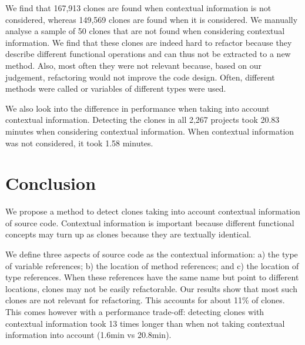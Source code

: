 \documentclass[conference]{IEEEtran}
\begin{document}
We find that 167,913 clones are found when contextual information is not considered, whereas 149,569 clones are found when it is considered. We manually analyse a sample of 50 clones that are not found when considering contextual information. We find that these clones are indeed hard to refactor because they describe different functional operations and can thus not be extracted to a new method. Also, most often they were not relevant because, based on our judgement, refactoring would not improve the code design. Often, different methods were called or variables of different types were used. 

We also look into the difference in performance when taking into account contextual information. Detecting the clones in all 2,267 projects took 20.83 minutes when considering contextual information. When contextual information was not considered, it took 1.58 minutes.  

\section{Conclusion}
We propose a method to detect clones taking into account contextual information of source code. Contextual information is important because different functional concepts may turn up as clones because they are textually identical.

We define three aspects of source code as the contextual information:  a) the type of variable references; b) the location of method references; and c) the location of type references. When these references have the same name but point to different locations, clones may not be easily refactorable. Our results show that most such clones are not relevant for refactoring. This accounts for about 11\% of clones. This comes however with a performance trade-off: detecting clones with contextual information took 13 times longer than when not taking contextual information into account (1.6min vs 20.8min).



\end{document}
